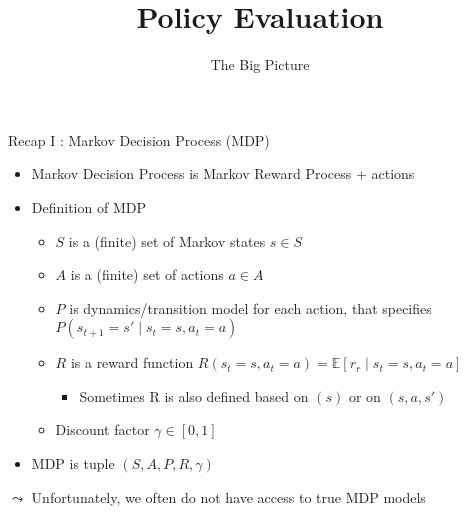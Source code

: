 


\title[Reinforcement Learning: Policy Evaluation]{Policy Evaluation}
\subtitle{The Big Picture}




	
	\maketitle

\begin{frame}[c]{Recap I : Markov Decision Process (MDP)}

\begin{itemize}
	\item Markov Decision Process is Markov Reward Process + actions
	\item Definition of MDP
	\begin{itemize}
		\item $S$ is a (finite) set of Markov states $s \in S$
		\item $A$ is a (finite) set of actions $a \in A$
		\item $P$ is dynamics/transition model for each action, that specifies $P(s_{t+1} = s' \mid s_t=s, a_t=a)$
		\item $R$ is a reward function 
		$R(s_t=s, a_t=a) = \mathbb{E}[r_r \mid s_t=s, a_t=a] $
		\begin{itemize}
			\item Sometimes R is also defined based on $(s)$ or on $(s,a,s')$
		\end{itemize}
		\item Discount factor $\gamma \in [0, 1]$
	\end{itemize}
	\item MDP is tuple $(S,A,P, R, \gamma)$
\end{itemize}

\pause

\medskip
$\leadsto$ Unfortunately, we often do not have access to true MDP models

\end{frame}

